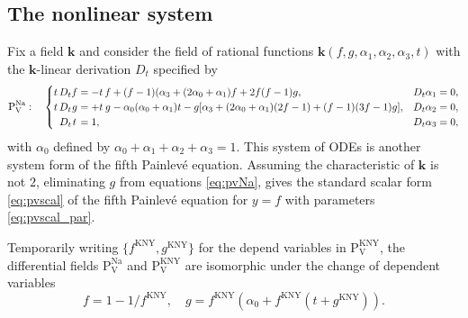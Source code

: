 \documentclass[a4paper,reqno]{amsart}
\numberwithin{equation}{section}
\numberwithin{figure}{section}
\theoremstyle{remark}
\newcommand\Pfive{\textrm{P}_{\textrm{V}}}
\begin{document}
\subsection{The nonlinear system}
Fix a field $\mathbf{k}$ and consider the field of rational functions $\mathbf{k}(f,g,\alpha_1,\alpha_2,\alpha_3,t)$ with the $\mathbf{k}$-linear derivation $D_t$ specified by
 \begin{equation}\label{eq:pvNa}
 \Pfive^\text{Na}:\quad           \begin{cases}
       t\, D_t f=-t\,f+(f-1)(\alpha_3+(2\alpha_0+\alpha_1)f+2f(f-1)g, &   D_t \alpha_1=0, \\
  t\, D_t \hspace{0.2mm}g\hspace{0.1mm}=+t\,\hspace{0.2mm}g\hspace{0.1mm}-\alpha_0(\alpha_0+\alpha_1)t-g[\alpha_3+(2\alpha_0+\alpha_1)(2f-1)+(f-1)(3f-1)g], &   D_t \alpha_2=0, \\
     \hspace{1.9mm}   D_t \hspace{0.4mm}t\hspace{0.4mm}=1, &   D_t \alpha_3=0, \\ 
    \end{cases}
    \end{equation}
with $\alpha_0$ defined by $\alpha_0+\alpha_1+\alpha_2+\alpha_3=1$.    
This system of ODEs is another system form of the fifth Painlev\'e equation. Assuming the characteristic of $\mathbf{k}$ is not $2$, eliminating $g$ from equations \eqref{eq:pvNa}, gives the standard scalar form \eqref{eq:pvscal} of the fifth Painlev\'e equation  for $y=f$ with parameters \eqref{eq:pvscal_par}.

Temporarily writing $\{f^\text{KNY},g^\text{KNY}\}$ for the depend variables in $\Pfive^\text{KNY}$, the differential fields $\Pfive^\text{Na}$ and $\Pfive^\text{KNY}$ are isomorphic under the change of dependent variables
\begin{equation}\label{eq:NatoKNY}
f=1-1/f^\text{KNY},\quad g=f^\text{KNY}(\alpha_0+f^\text{KNY}(t+g^\text{KNY})).
\end{equation}
\end{document}
